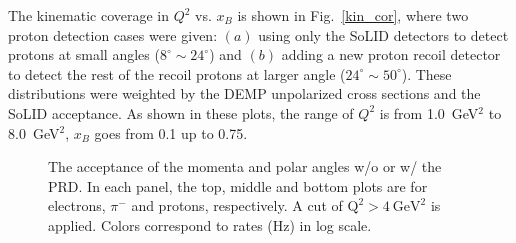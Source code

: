 The kinematic coverage in $Q^{2}$ vs. $x_{B}$ is shown in Fig.~\ref{kin_cor},
where two proton detection cases were given: $(a)$ using only the SoLID
detectors to detect protons at small angles ($8^{\circ}\sim24^{\circ}$) and
$(b)$ adding a new proton recoil detector to detect the rest of the recoil
protons at larger angle ($24^{\circ}\sim50^{\circ}$). These distributions were
weighted by the DEMP unpolarized cross sections and the SoLID acceptance.
 As shown in these plots, the range of $Q^{2}$ is from 1.0~GeV$^{2}$ to
8.0~GeV$^{2}$, $x_{B}$ goes from 0.1 up to 0.75.

\begin{figure}[!ht]
 \begin{center}
   \caption[The acceptance of the momenta and scattering angles for electrons,
     $\pi^{-}$ and protons]{\footnotesize{The acceptance of the momenta and
       polar angles w/o or w/ the PRD. In each panel, the top, middle and
       bottom plots are for electrons, $\pi^{-}$ and protons, respectively. A
       cut of $\mathrm{Q^{2}>4~GeV^{2}}$ is applied. Colors correspond to rates
       (Hz) in log scale.}}
  \label{p_theta}
  \end{center}
\end{figure}

